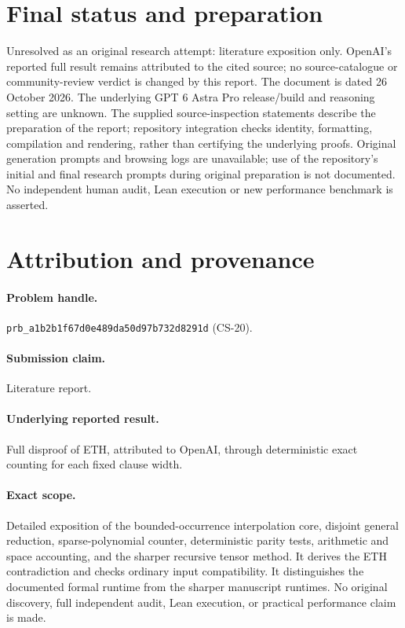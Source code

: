 \documentclass[11pt,a4paper]{article}
\numberwithin{equation}{section}
\theoremstyle{definition}
\theoremstyle{remark}
\begin{document}
\section{Final status and preparation}
Unresolved as an original research attempt: literature exposition only. OpenAI's reported full result remains attributed to the cited source; no source-catalogue or community-review verdict is changed by this report.
The document is dated 26 October 2026. The underlying GPT 6 Astra Pro release/build and reasoning setting are unknown. The supplied source-inspection statements describe the preparation of the report; repository integration checks identity, formatting, compilation and rendering, rather than certifying the underlying proofs. Original generation prompts and browsing logs are unavailable; use of the repository's initial and final research prompts during original preparation is not documented. No independent human audit, Lean execution or new performance benchmark is asserted.


\section{Attribution and provenance}
\paragraph{Problem handle.} \texttt{prb\_a1b2b1f67d0e489da50d97b732d8291d}
(CS-20).
\paragraph{Submission claim.} Literature report.
\paragraph{Underlying reported result.} Full disproof of ETH, attributed to
OpenAI, through deterministic exact counting for each fixed clause width.
\paragraph{Exact scope.} Detailed exposition of the bounded-occurrence
interpolation core, disjoint general reduction, sparse-polynomial counter,
deterministic parity tests, arithmetic and space accounting, and the sharper
recursive tensor method. It derives the ETH contradiction and checks ordinary
input compatibility. It distinguishes the documented formal runtime from the
sharper manuscript runtimes. No original discovery, full independent audit,
Lean execution, or practical performance claim is made.
\end{document}
